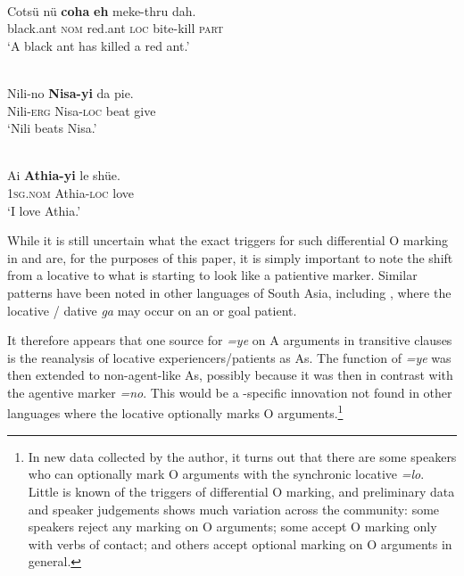 \documentclass[output=paper]{LSP/langsci}
\begin{document}
\ea\label{13-te-ex:35}
\\
\gll Cotsü nü \textbf{coha} \textbf{eh} meke-thru dah.\\
black.ant \textsc{nom} red.ant \textsc{loc} bite-kill \textsc{part}\\
\glt `A black ant has killed a red ant.'
\z

\ea\label{13-te-ex:36}
 \\
\gll Nili-no \textbf{Nisa-yi} da pie.\\
Nili-\textsc{erg} Nisa-\textsc{loc} beat give\\
\glt `Nili beats Nisa.'
\z

\ea\label{13-te-ex:37}
\\
\gll Ai \textbf{Athia-yi} le shüe.\\
\textsc{1sg.nom} Athia-\textsc{loc} love\\
\glt  `I love Athia.'
\z

While it is still uncertain what the exact triggers for such differential O marking in  and  are, for the purposes of this paper, it is simply important to note the shift from a locative to what is starting to look like a patientive marker. 
Similar patterns have been noted in other  languages of South Asia, including  \citep[156]{Andvik2010Grammar}, where the locative / dative \textit{ga} may occur on an  or goal patient.

It therefore appears that one source for \textit{=ye} on A arguments in transitive clauses is the reanalysis of locative experiencers/patients as  As. The function of \textit{=ye} was then extended to non-agent-like As, possibly because it was then in contrast with the agentive marker \textit{=no}. This would be a -specific innovation not found in other  languages where the locative optionally marks O arguments.\footnote{In new data collected by the author, it turns out that there are some  speakers who can optionally mark O arguments with the synchronic  locative \textit{=lo}. Little is known of the triggers of differential O marking, and preliminary data and speaker judgements shows much variation across the community: some speakers reject any marking on O arguments; some accept O marking only with verbs of contact; and others accept optional marking on O arguments in general.}
\end{document}
